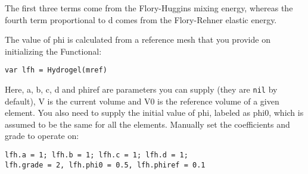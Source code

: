 The first three terms come from the Flory-Huggins mixing energy, whereas
the fourth term proportional to d comes from the Flory-Rehner elastic
energy.

The value of phi is calculated from a reference mesh that you provide on
initializing the Functional:

\begin{lstlisting}
var lfh = Hydrogel(mref)
\end{lstlisting}

Here, a, b, c, d and phiref are parameters you can supply (they are
\texttt{nil} by default), V is the current volume and V0 is the
reference volume of a given element. You also need to supply the initial
value of phi, labeled as phi0, which is assumed to be the same for all
the elements. Manually set the coefficients and grade to operate on:

\begin{lstlisting}
lfh.a = 1; lfh.b = 1; lfh.c = 1; lfh.d = 1;
lfh.grade = 2, lfh.phi0 = 0.5, lfh.phiref = 0.1
\end{lstlisting}

